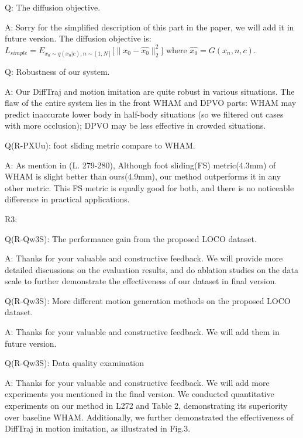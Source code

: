 \documentclass{article}
\begin{document}
Q: The diffusion objective.

A: Sorry for the simplified description of this part in the paper, we will add it in future version. The diffusion objective is: $
L_{simple} = E_{x_0 \sim q(x_0|c),n \sim [1,N]} \big[\big\|x_0-\hat{x_0}\big\|^2_2\big]$ where $\hat{x_0} = G(x_n,n,c)$. 


Q: Robustness of our system.

A: Our DiffTraj and motion imitation are quite robust in various situations. The flaw of the entire system lies in the front WHAM and DPVO parts: WHAM may predict inaccurate lower body in half-body situations (so we filtered out cases with more occlusion); DPVO may be less effective in crowded situations.

Q(R-PXUu): foot sliding metric compare to WHAM.

A: As mention in (L. 279-280), Although foot sliding(FS) metric(4.3mm) of WHAM is slight better than ours(4.9mm), our method outperforms it in any other metric. This FS metric is equally good for both, and there is no noticeable difference in practical applications.



R3:

Q(R-Qw3S): The performance gain from the proposed LOCO dataset.

A: Thanks for your valuable and constructive feedback. We will provide more detailed discussions on the evaluation results, and do ablation studies on the data scale to further demonstrate the effectiveness of our dataset in final version.



Q(R-Qw3S): More different motion generation methods on the proposed LOCO dataset.

A: Thanks for your valuable and constructive feedback. We will add them in future version.


Q(R-Qw3S): Data quality examination

A: Thanks for your valuable and constructive feedback. We will add more experiments you mentioned in the final version. We conducted quantitative experiments on our method in L272 and Table 2, demonstrating its superiority over baseline WHAM. Additionally, we further demonstrated the effectiveness of DiffTraj in motion imitation, as illustrated in Fig.3. 

\end{document}
